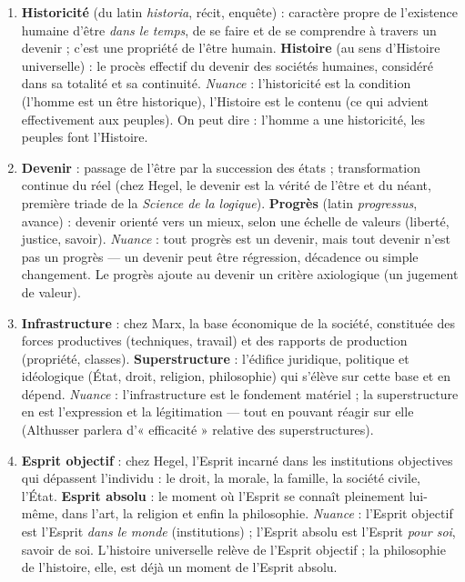 \documentclass[11pt]{article}
\begin{document}
\begin{corrige}
\begin{enumerate}
\item \textbf{Historicité} (du latin \emph{historia}, récit, enquête) : caractère propre de l'existence humaine d'être \emph{dans le temps}, de se faire et de se comprendre à travers un devenir ; c'est une propriété de l'être humain. \textbf{Histoire} (au sens d'Histoire universelle) : le procès effectif du devenir des sociétés humaines, considéré dans sa totalité et sa continuité. \emph{Nuance} : l'historicité est la condition (l'homme est un être historique), l'Histoire est le contenu (ce qui advient effectivement aux peuples). On peut dire : l'homme a une historicité, les peuples font l'Histoire.
\item \textbf{Devenir} : passage de l'être par la succession des états ; transformation continue du réel (chez Hegel, le devenir est la vérité de l'être et du néant, première triade de la \emph{Science de la logique}). \textbf{Progrès} (latin \emph{progressus}, avance) : devenir orienté vers un mieux, selon une échelle de valeurs (liberté, justice, savoir). \emph{Nuance} : tout progrès est un devenir, mais tout devenir n'est pas un progrès — un devenir peut être régression, décadence ou simple changement. Le progrès ajoute au devenir un critère axiologique (un jugement de valeur).
\item \textbf{Infrastructure} : chez Marx, la base économique de la société, constituée des forces productives (techniques, travail) et des rapports de production (propriété, classes). \textbf{Superstructure} : l'édifice juridique, politique et idéologique (État, droit, religion, philosophie) qui s'élève sur cette base et en dépend. \emph{Nuance} : l'infrastructure est le fondement matériel ; la superstructure en est l'expression et la légitimation — tout en pouvant réagir sur elle (Althusser parlera d'« efficacité » relative des superstructures).
\item \textbf{Esprit objectif} : chez Hegel, l'Esprit incarné dans les institutions objectives qui dépassent l'individu : le droit, la morale, la famille, la société civile, l'État. \textbf{Esprit absolu} : le moment où l'Esprit se connaît pleinement lui-même, dans l'art, la religion et enfin la philosophie. \emph{Nuance} : l'Esprit objectif est l'Esprit \emph{dans le monde} (institutions) ; l'Esprit absolu est l'Esprit \emph{pour soi}, savoir de soi. L'histoire universelle relève de l'Esprit objectif ; la philosophie de l'histoire, elle, est déjà un moment de l'Esprit absolu.
\end{enumerate}
\end{corrige}
\end{document}

